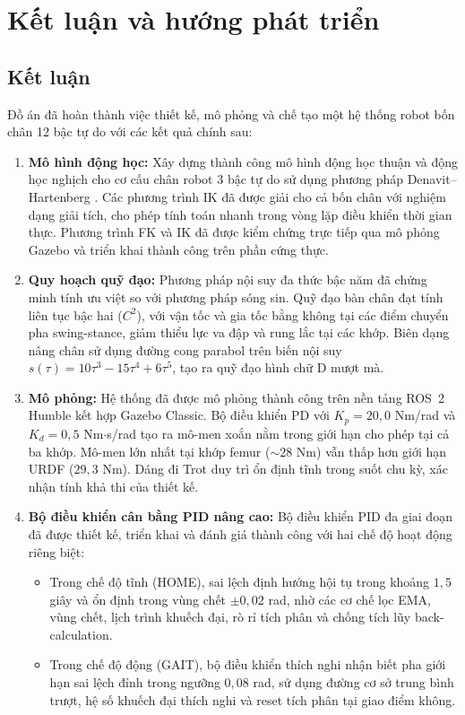 \chapter{Kết luận và hướng phát triển}

\section{Kết luận}

Đồ án đã hoàn thành việc thiết kế, mô phỏng và chế tạo một hệ thống robot bốn chân 12 bậc tự do với các kết quả chính sau:

\begin{enumerate}
    \item \textbf{Mô hình động học:} Xây dựng thành công mô hình động học thuận và động học nghịch cho cơ cấu chân robot 3 bậc tự do sử dụng phương pháp Denavit--Hartenberg \cite{denavit1955}. Các phương trình IK đã được giải cho cả bốn chân với nghiệm dạng giải tích, cho phép tính toán nhanh trong vòng lặp điều khiển thời gian thực. Phương trình FK và IK đã được kiểm chứng trực tiếp qua mô phỏng Gazebo và triển khai thành công trên phần cứng thực.

    \item \textbf{Quy hoạch quỹ đạo:} Phương pháp nội suy đa thức bậc năm đã chứng minh tính ưu việt so với phương pháp sóng sin. Quỹ đạo bàn chân đạt tính liên tục bậc hai ($C^2$), với vận tốc và gia tốc bằng không tại các điểm chuyển pha swing-stance, giảm thiểu lực va đập và rung lắc tại các khớp. Biên dạng nâng chân sử dụng đường cong parabol trên biến nội suy $s(\tau) = 10\tau^3 - 15\tau^4 + 6\tau^5$, tạo ra quỹ đạo hình chữ D mượt mà.

    \item \textbf{Mô phỏng:} Hệ thống đã được mô phỏng thành công trên nền tảng ROS~2 Humble kết hợp Gazebo Classic. Bộ điều khiển PD với $K_p = 20{,}0$ Nm/rad và $K_d = 0{,}5$ Nm$\cdot$s/rad tạo ra mô-men xoắn nằm trong giới hạn cho phép tại cả ba khớp. Mô-men lớn nhất tại khớp femur ($\sim 28$ Nm) vẫn thấp hơn giới hạn URDF ($29{,}3$ Nm). Dáng đi Trot duy trì ổn định tĩnh trong suốt chu kỳ, xác nhận tính khả thi của thiết kế.

    \item \textbf{Bộ điều khiển cân bằng PID nâng cao:} Bộ điều khiển PID đa giai đoạn đã được thiết kế, triển khai và đánh giá thành công với hai chế độ hoạt động riêng biệt:
    \begin{itemize}
        \item Trong chế độ tĩnh (HOME), sai lệch định hướng hội tụ trong khoảng $1{,}5$ giây và ổn định trong vùng chết $\pm 0{,}02$ rad, nhờ các cơ chế lọc EMA, vùng chết, lịch trình khuếch đại, rò rỉ tích phân và chống tích lũy back-calculation.
        \item Trong chế độ động (GAIT), bộ điều khiển thích nghi nhận biết pha giới hạn sai lệch đỉnh trong ngưỡng $0{,}08$ rad, sử dụng đường cơ sở trung bình trượt, hệ số khuếch đại thích nghi và reset tích phân tại giao điểm không.
    \end{itemize}


\end{enumerate}
